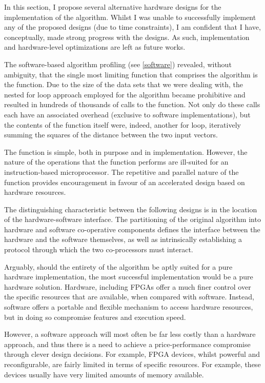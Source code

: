In this section, I propose several alternative hardware designs for the
implementation of the  algorithm.
Whilst I was unable to successfully implement any of the proposed designs (due
to time constraints), I am confident that I have, conceptually, made strong
progress with the designs. As such, implementation and hardware-level
optimizations are left as future works.

The software-based algorithm profiling (see \autoref{software}) revealed,
without ambiguity, that the single most limiting function that comprises the
 algorithm is the
 function. Due to the size of the data sets that we
were dealing with, the nested for loop approach employed for the algorithm
became prohibitive and resulted in hundreds of thousands of calls to the
 function. Not only do these calls each have an
associated overhead (exclusive to software implementations), but the contents of
the function itself were, indeed, another for loop, iteratively summing the
squares of the distance between the two input vectors.

The  function is simple, both in purpose and in
implementation. However, the nature of the operations that the function
performs are ill-suited for an instruction-based microprocessor. The repetitive
and parallel nature of the function provides encouragement in favour of an
accelerated design based on hardware resources.

The distinguishing characteristic between the following designs is in the
location of the hardware-software interface. The partitioning of the original
algorithm into hardware and software co-operative components defines the
interface between the hardware and the software themselves, as well as
intrinsically establishing a protocol through which the two co-processors must
interact.

Arguably, should the entirety of the algorithm be aptly suited for a pure
hardware implementation, the most successful implementation would be a pure
hardware solution. Hardware, including \glspl{FPGA} offer a much finer control
over the specific resources that are available, when compared with software.
Instead, software offers a portable and flexible mechanism to access hardware
resources, but in doing so compromise features and execution speed.

However, a software approach will most often be far less costly than a hardware
approach, and thus there is a need to achieve a price-performance compromise
through clever design decisions. For example, \gls{FPGA} devices, whilst
powerful and reconfigurable, are fairly limited in terms of specific resources.
For example, these devices usually have very limited amounts of memory
available.

